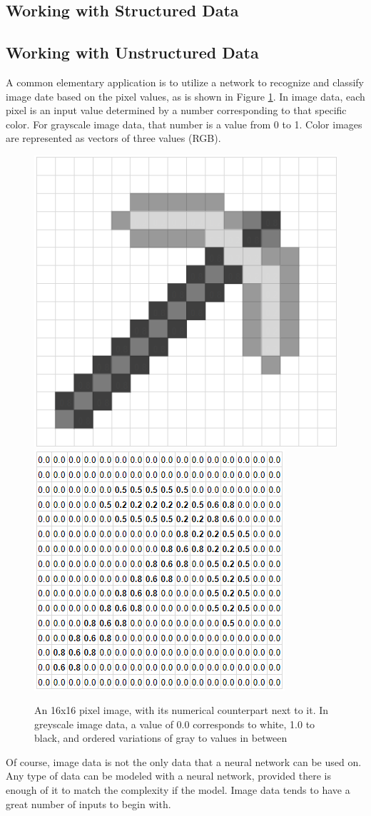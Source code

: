 \subsection{Working with Structured Data} %

\subsection{Working with Unstructured Data} %


A common elementary application is to utilize a network to recognize and classify image date based on the pixel values, as is shown in Figure \ref{minecraft}.  In image data, each pixel is an input value determined by a number corresponding to that specific color.  For grayscale image data, that number is a value from 0 to 1.  Color images are represented as vectors of three values (RGB).

\begin{figure}[H]
    \centering
    \includegraphics[width=.35\textwidth]{Figures/pickaxe_1.png}
    \hspace{30pt}
    \includegraphics[width=.35\textwidth]{Figures/pickaxe_2.png}
    \caption{\footnotesize{An 16x16 pixel image, with its numerical counterpart next to it.  In greyscale image data, a value of 0.0 corresponds to white, 1.0 to black, and ordered variations of gray to values in between}}
    \label{minecraft}
\end{figure}

Of course, image data is not the only data that a neural network can be used on.  Any type of data can be modeled with a neural network, provided there is enough of it to match the complexity if the model.  Image data tends to have a great number of inputs to begin with.